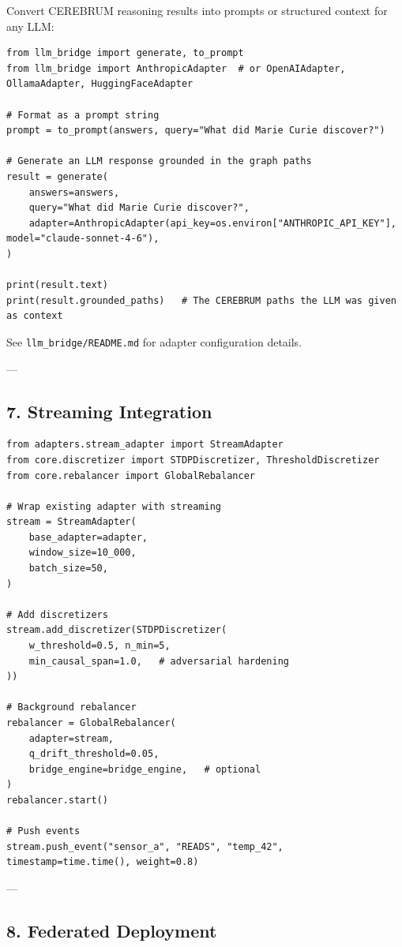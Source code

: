 \documentclass[11pt,article,oneside]{memoir}
\begin{document}
Convert CEREBRUM reasoning results into prompts or structured context for any LLM:

\begin{lstlisting}
from llm_bridge import generate, to_prompt
from llm_bridge import AnthropicAdapter  # or OpenAIAdapter, OllamaAdapter, HuggingFaceAdapter

# Format as a prompt string
prompt = to_prompt(answers, query="What did Marie Curie discover?")

# Generate an LLM response grounded in the graph paths
result = generate(
    answers=answers,
    query="What did Marie Curie discover?",
    adapter=AnthropicAdapter(api_key=os.environ["ANTHROPIC_API_KEY"], model="claude-sonnet-4-6"),
)

print(result.text)
print(result.grounded_paths)   # The CEREBRUM paths the LLM was given as context
\end{lstlisting}

See \texttt{llm\_bridge/README.md} for adapter confi\-guration details.

---

\subsection{7. Streaming Integration}

\begin{lstlisting}
from adapters.stream_adapter import StreamAdapter
from core.discretizer import STDPDiscretizer, ThresholdDiscretizer
from core.rebalancer import GlobalRebalancer

# Wrap existing adapter with streaming
stream = StreamAdapter(
    base_adapter=adapter,
    window_size=10_000,
    batch_size=50,
)

# Add discretizers
stream.add_discretizer(STDPDiscretizer(
    w_threshold=0.5, n_min=5,
    min_causal_span=1.0,   # adversarial hardening
))

# Background rebalancer
rebalancer = GlobalRebalancer(
    adapter=stream,
    q_drift_threshold=0.05,
    bridge_engine=bridge_engine,   # optional
)
rebalancer.start()

# Push events
stream.push_event("sensor_a", "READS", "temp_42", timestamp=time.time(), weight=0.8)
\end{lstlisting}

---

\subsection{8. Federated Deployment}
\end{document}
